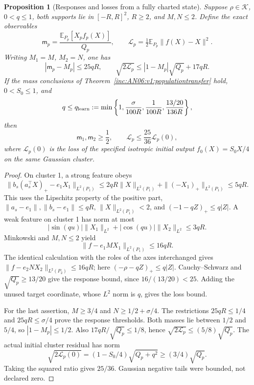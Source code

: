 \documentclass[11pt]{article}
\numberwithin{equation}{section}
\newtheorem{proposition}[theorem]{Proposition}
\theoremstyle{remark}\newtheorem{remark}[theorem]{Remark}
\newcommand{\E}{\mathbb E}
\newcommand{\1}{\mathbf 1}
\begin{document}
\begin{proposition}[Responses and losses from a fully charted state]
\label{inc:AN06:v1:staticproposition}
Suppose $\rho\in\mathcal K$, $0<q\le1$, both supports lie in $[-R,R]^2$,
$R\ge2$, and $M,N\le2$. Define the exact observables
\[
 \mathsf m_p=\frac{\E_{P_p}[X_pf_p(X)]}{Q_p},\qquad
 \mathcal L_p=\tfrac12\E_{P_p}\|f(X)-X\|^2.
\]
Writing $M_1=M$, $M_2=N$, one has
\begin{equation}\label{inc:AN06:v1:staticbounds}
 |\mathsf m_p-M_p|\le25qR,\qquad
 \sqrt{2\mathcal L_p}\le |1-M_p|\sqrt{Q_p}+17qR.
\end{equation}
If the mass conclusions of
Theorem~\ref{inc:AN06:v1:populationtransfer} hold, $0<S_0\le1$, and
\begin{equation}\label{inc:AN06:v1:qlearn}
 q\le q_{\rm learn}:=
 \min\left\{1,\frac{\sigma}{100R},\frac1{100R},
                  \frac{13/20}{136R}\right\},
\end{equation}
then
\begin{equation}\label{inc:AN06:v1:learningconclusion}
 \mathsf m_1,\mathsf m_2\ge\frac12,\qquad
 \mathcal L_p\le\frac{25}{36}\mathcal L_p(0),
\end{equation}
where $\mathcal L_p(0)$ is the loss of the specified isotropic initial
output $f_0(X)=S_0X/4$ on the same Gaussian cluster.
\end{proposition}
\begin{proof}
On cluster 1, a strong feature obeys
\[
 \|b_s(a_s^\top X)_+-e_1X_1\|_{L^2(P_1)}
 \le2qR\|X\|_{L^2(P_1)}+\|(-X_1)_+\|_{L^2(P_1)}\le5qR.
\]
This uses the Lipschitz property of the positive part,
$\|a_s-e_1\|,\|b_s-e_1\|\le qR$,
$\|X\|_{L^2(P_1)}<2$, and
$(-1-qZ)_+\le q|Z|$.
A weak feature on cluster 1 has norm at most
\[
 |\sin(qu)|\|X_1\|_{L^2}+|\cos(qu)|\|X_2\|_{L^2}\le3qR.
\]
Minkowski and $M,N\le2$ yield
\[
 \|f-e_1MX_1\|_{L^2(P_1)}\le16qR.
\]
The identical calculation with the roles of the axes interchanged gives
$\|f-e_2NX_2\|_{L^2(P_2)}\le16qR$; here
$(-\rho-qZ)_+\le q|Z|$.
Cauchy--Schwarz and $\sqrt{Q_p}\ge13/20$ give the response bound,
since $16/(13/20)<25$. Adding the unused target coordinate, whose
$L^2$ norm is $q$, gives the loss bound.

For the last assertion, $M\ge3/4$ and $N\ge1/2+\sigma/4$.
The restrictions $25qR\le1/4$ and $25qR\le\sigma/4$ prove the response
thresholds. Both masses lie between $1/2$ and $5/4$, so
$|1-M_p|\le1/2$. Also $17qR/\sqrt{Q_p}\le1/8$, hence
$\sqrt{2\mathcal L_p}\le(5/8)\sqrt{Q_p}$.
The actual initial cluster residual has norm
\[
 \sqrt{2\mathcal L_p(0)}=(1-S_0/4)\sqrt{Q_p+q^2}
 \ge(3/4)\sqrt{Q_p}.
\]
Taking the squared ratio gives $25/36$.
Gaussian negative tails were bounded, not declared zero.
\end{proof}
\end{document}
